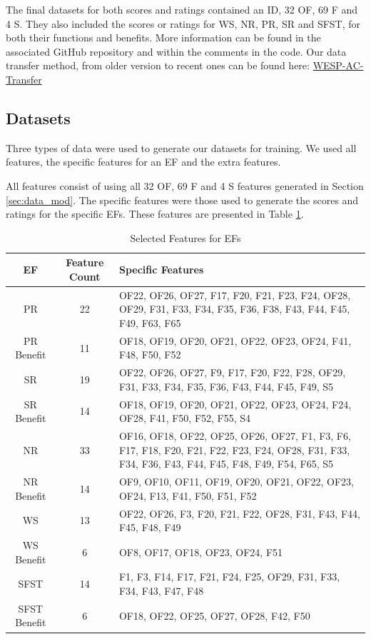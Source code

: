 \documentclass[12pt,letterpaper]{article}
\begin{document}
The final datasets for both scores and ratings contained an ID, 32 \ac{OF}, 69 \ac{F} and 4 \ac{S}.
They also included the scores or ratings for \ac{WS}, \ac{NR}, \ac{PR}, \ac{SR} and \ac{SFST}, for both their functions and benefits.
More information can be found in the associated GitHub repository and within the comments in the code.
Our data transfer method, from older version to recent ones can be found here: \href{https://github.com/majrblais/WESPAC-Transfer}{WESP-AC-Transfer}


\subsection{Datasets}
Three types of data were used to generate our datasets for training.
We used all features, the specific features for an \ac{EF} and the extra features.

All features consist of using all 32 OF, 69 F and 4 S features generated in Section \ref{sec:data_mod}.
The specific features were those used to generate the scores and ratings for the specific \acp{EF}.
These features are presented in Table \ref{tab:data_spec_features}.

\begin{table}[h]
    \centering
    \begin{tabular}{|c|c|m{8cm}|}
        \hline
        \textbf{EF} & \textbf{Feature Count} & \textbf{Specific Features} \\
        \hline
       \ac{PR} & 22 & OF22, OF26, OF27, F17, F20, F21, F23, F24, OF28, OF29, F31, F33, F34, F35, F36, F38, F43, F44, F45, F49, F63, F65 \\
        \hline
       \ac{PR} Benefit & 11 & OF18, OF19, OF20, OF21, OF22, OF23, OF24, F41, F48, F50, F52 \\
        \hline
       \ac{SR} & 19 & OF22, OF26, OF27, F9, F17, F20, F22, F28, OF29, F31, F33, F34, F35, F36, F43, F44, F45, F49, S5 \\
        \hline
       \ac{SR} Benefit & 14 & OF18, OF19, OF20, OF21, OF22, OF23, OF24, F24, OF28, F41, F50, F52, F55, S4 \\
        \hline
       \ac{NR} & 33 & OF16, OF18, OF22, OF25, OF26, OF27, F1, F3, F6, F17, F18, F20, F21, F22, F23, F24, OF28, F31, F33, F34, F36, F43, F44, F45, F48, F49, F54, F65, S5 \\
        \hline
       \ac{NR} Benefit & 14 & OF9, OF10, OF11, OF19, OF20, OF21, OF22, OF23, OF24, F13, F41, F50, F51, F52 \\
        \hline
       \ac{WS} & 13 & OF22, OF26, F3, F20, F21, F22, OF28, F31, F43, F44, F45, F48, F49 \\
        \hline
       \ac{WS} Benefit & 6 & OF8, OF17, OF18, OF23, OF24, F51 \\
        \hline
       \ac{SFST} & 14 & F1, F3, F14, F17, F21, F24, F25, OF29, F31, F33, F34, F43, F47, F48 \\
        \hline
       \ac{SFST} Benefit & 6 & OF18, OF22, OF25, OF27, OF28, F42, F50 \\
        \hline
    \end{tabular}
    \caption{Selected Features for EFs}
    \label{tab:data_spec_features}
\end{table}
\end{document}
